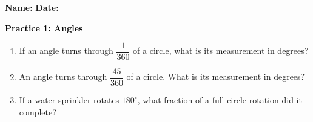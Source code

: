 \documentclass[12pt, letterpaper, fleqn]{article}
\begin{document}
\textbf{Name:} \underline{\hspace{5cm}}
\hfill
\textbf{Date:} \underline{\hspace{3cm}}\\

\begin{tcolorbox}[colback=customteal!20]
    \large\textcolor{black}{\textbf{Practice 1: Angles}}
\end{tcolorbox}
\begin{enumerate}[itemsep=3.5cm, leftmargin=0.6cm]
\item If an angle turns through $\dfrac{1}{360}$ of a circle, what is its measurement in degrees?
\vspace{3.5cm}
\item An angle turns through $\dfrac{45}{360}$ of a circle. What is its measurement in degrees?
\vspace{3.5cm}
\item If a water sprinkler rotates $180^\circ$, what fraction of a full circle rotation did it complete?
\end{enumerate}
\end{document}
